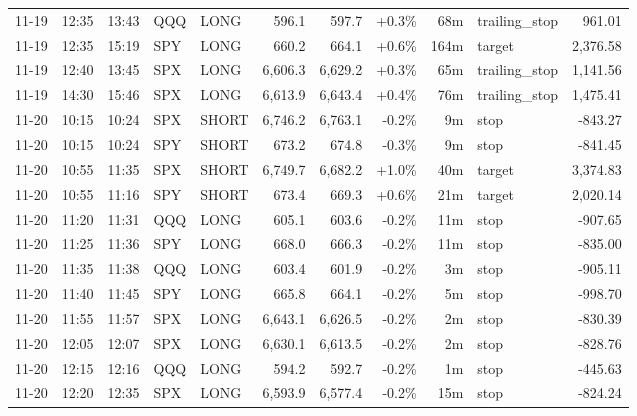 \documentclass[11pt,a4paper,twoside]{article}
\begin{document}
\begin{center}
\begin{longtable}{>{\color{txtmain}}l l l l l r r r r >{\color{txtmain}}l r}
11-19 & 12:35 & 13:43 & QQQ & LONG & 596.1 & 597.7 & \textcolor{wingreen}{+0.3\%} & 68m & trailing\_stop & \textcolor{wingreen}{961.01} \\
11-19 & 12:35 & 15:19 & SPY & LONG & 660.2 & 664.1 & \textcolor{wingreen}{+0.6\%} & 164m & target & \textcolor{wingreen}{2,376.58} \\
11-19 & 12:40 & 13:45 & SPX & LONG & 6,606.3 & 6,629.2 & \textcolor{wingreen}{+0.3\%} & 65m & trailing\_stop & \textcolor{wingreen}{1,141.56} \\
11-19 & 14:30 & 15:46 & SPX & LONG & 6,613.9 & 6,643.4 & \textcolor{wingreen}{+0.4\%} & 76m & trailing\_stop & \textcolor{wingreen}{1,475.41} \\
11-20 & 10:15 & 10:24 & SPX & SHORT & 6,746.2 & 6,763.1 & \textcolor{lossred}{-0.2\%} & 9m & stop & \textcolor{lossred}{-843.27} \\
11-20 & 10:15 & 10:24 & SPY & SHORT & 673.2 & 674.8 & \textcolor{lossred}{-0.3\%} & 9m & stop & \textcolor{lossred}{-841.45} \\
11-20 & 10:55 & 11:35 & SPX & SHORT & 6,749.7 & 6,682.2 & \textcolor{wingreen}{+1.0\%} & 40m & target & \textcolor{wingreen}{3,374.83} \\
11-20 & 10:55 & 11:16 & SPY & SHORT & 673.4 & 669.3 & \textcolor{wingreen}{+0.6\%} & 21m & target & \textcolor{wingreen}{2,020.14} \\
11-20 & 11:20 & 11:31 & QQQ & LONG & 605.1 & 603.6 & \textcolor{lossred}{-0.2\%} & 11m & stop & \textcolor{lossred}{-907.65} \\
11-20 & 11:25 & 11:36 & SPY & LONG & 668.0 & 666.3 & \textcolor{lossred}{-0.2\%} & 11m & stop & \textcolor{lossred}{-835.00} \\
11-20 & 11:35 & 11:38 & QQQ & LONG & 603.4 & 601.9 & \textcolor{lossred}{-0.2\%} & 3m & stop & \textcolor{lossred}{-905.11} \\
11-20 & 11:40 & 11:45 & SPY & LONG & 665.8 & 664.1 & \textcolor{lossred}{-0.2\%} & 5m & stop & \textcolor{lossred}{-998.70} \\
11-20 & 11:55 & 11:57 & SPX & LONG & 6,643.1 & 6,626.5 & \textcolor{lossred}{-0.2\%} & 2m & stop & \textcolor{lossred}{-830.39} \\
11-20 & 12:05 & 12:07 & SPX & LONG & 6,630.1 & 6,613.5 & \textcolor{lossred}{-0.2\%} & 2m & stop & \textcolor{lossred}{-828.76} \\
11-20 & 12:15 & 12:16 & QQQ & LONG & 594.2 & 592.7 & \textcolor{lossred}{-0.2\%} & 1m & stop & \textcolor{lossred}{-445.63} \\
11-20 & 12:20 & 12:35 & SPX & LONG & 6,593.9 & 6,577.4 & \textcolor{lossred}{-0.2\%} & 15m & stop & \textcolor{lossred}{-824.24} \\

\end{longtable}
\end{center}
\end{document}

